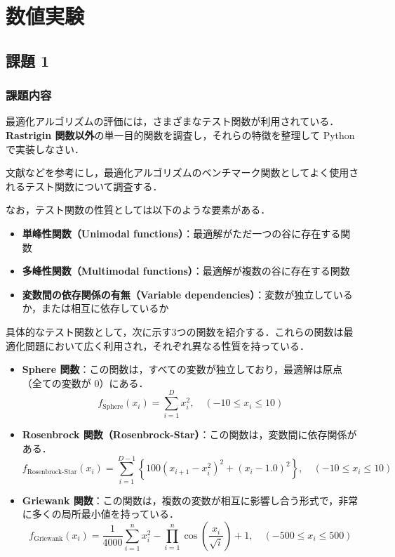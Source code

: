 \section{数値実験}

\subsection{課題 1}
\subsubsection{課題内容}
最適化アルゴリズムの評価には，さまざまなテスト関数が利用されている．\textbf{Rastrigin 関数以外}の単一目的関数を調査し，それらの特徴を整理して Python で実装しなさい．

文献\cite{ref4}などを参考にし，最適化アルゴリズムのベンチマーク関数としてよく使用されるテスト関数について調査する．

なお，テスト関数の性質としては以下のような要素がある．

\begin{itemize}
  \item \textbf{単峰性関数（Unimodal functions）}：最適解がただ一つの谷に存在する関数
  \item \textbf{多峰性関数（Multimodal functions）}：最適解が複数の谷に存在する関数
  \item \textbf{変数間の依存関係の有無（Variable dependencies）}：変数が独立しているか，または相互に依存しているか
\end{itemize}

具体的なテスト関数として，次に示す3つの関数を紹介する．これらの関数は最適化問題において広く利用され，それぞれ異なる性質を持っている．

\begin{itemize}
  \item \textbf{Sphere 関数}：この関数は，すべての変数が独立しており，最適解は原点（全ての変数が 0）にある．
  \[
    f_{\mathrm{Sphere}}(x_i) = \sum_{i=1}^{D} x_i^2,\quad (-10 \leq x_i \leq 10) \tag{6}
  \]

  \item \textbf{Rosenbrock 関数（Rosenbrock-Star）}：この関数は，変数間に依存関係がある．
  \[
    f_{\mathrm{Rosenbrock\mbox{-}Star}}(x_i) = \sum_{i=1}^{D-1} \left\{100(x_{i+1} - x_i^2)^2 + (x_i - 1.0)^2 \right\},\quad (-10 \leq x_i \leq 10) \tag{7}
  \]

  \item \textbf{Griewank 関数}：この関数は，複数の変数が相互に影響し合う形式で，非常に多くの局所最小値を持っている．
  \[
    f_{\mathrm{Griewank}}(x_i) = \frac{1}{4000} \sum_{i=1}^{n} x_i^2 - \prod_{i=1}^{n} \cos\left(\frac{x_i}{\sqrt{i}}\right) + 1,\quad (-500 \leq x_i \leq 500) \tag{8}
  \]
\end{itemize}

